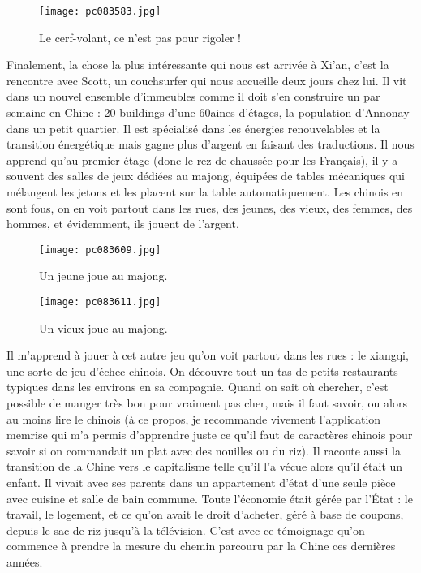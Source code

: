 \documentclass{book}
\begin{document}
\begin{figure}[h]
\centering
\texttt{[image: pc083583.jpg]}
\caption*{Le cerf-volant, ce n'est pas pour rigoler !}
\end{figure}

Finalement, la chose la plus intéressante qui nous est arrivée à Xi'an, c'est la rencontre avec Scott, un couchsurfer qui nous accueille deux jours chez lui. Il vit dans un nouvel ensemble d'immeubles comme il doit s'en construire un par semaine en Chine : 20 buildings d'une 60aines d'étages, la population d'Annonay dans un petit quartier. Il est spécialisé dans les énergies renouvelables et la transition énergétique mais gagne plus d'argent en faisant des traductions. Il nous apprend qu'au premier étage (donc le rez-de-chaussée pour les Français), il y a souvent des salles de jeux dédiées au majong, équipées de tables mécaniques qui mélangent les jetons et les placent sur la table automatiquement. Les chinois en sont fous, on en voit partout dans les rues, des jeunes, des vieux, des femmes, des hommes, et évidemment, ils jouent de l'argent.


\begin{figure}[h]
\centering
\texttt{[image: pc083609.jpg]}
\caption*{Un jeune joue au majong.}
\end{figure}


\begin{figure}[h]
\centering
\texttt{[image: pc083611.jpg]}
\caption*{Un vieux joue au majong.}
\end{figure}

Il m'apprend à jouer à cet autre jeu qu'on voit partout dans les rues : le xiangqi, une sorte de jeu d'échec chinois. On découvre tout un tas de petits restaurants typiques dans les environs en sa compagnie. Quand on sait où chercher, c'est possible de manger très bon pour vraiment pas cher, mais il faut savoir, ou alors au moins lire le chinois (à ce propos, je recommande vivement l'application memrise qui m'a permis d'apprendre juste ce qu'il faut de caractères chinois pour savoir si on commandait un plat avec des nouilles ou du riz). Il raconte aussi la transition de la Chine vers le capitalisme telle qu'il l'a vécue alors qu'il était un enfant. Il vivait avec ses parents dans un appartement d'état d'une seule pièce avec cuisine et salle de bain commune. Toute l'économie était gérée par l’État : le travail, le logement, et ce qu'on avait le droit d'acheter, géré à base de coupons, depuis le sac de riz jusqu'à la télévision.
C'est avec ce témoignage qu'on commence à prendre la mesure du chemin parcouru par la Chine ces dernières années.
\end{document}
